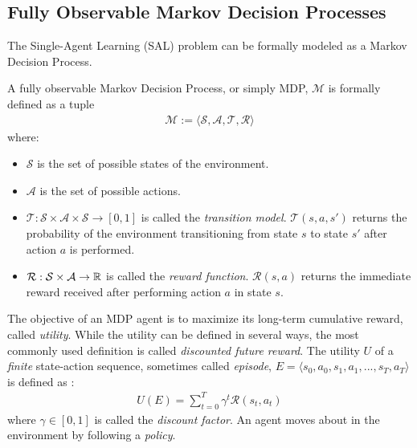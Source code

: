 \subsection{Fully Observable Markov Decision Processes}
\label{sec:mdp}
The Single-Agent Learning (SAL) problem can be formally modeled as a Markov Decision Process.
\begin{definition}
\label{def:fomdp}
A fully observable Markov Decision Process, or simply MDP, $\mathcal{M}$ is formally defined as a tuple \cite{Russell:2009:AIM:1671238}
\begin{align*}
    \mathcal{M} := \big \langle \mathcal{S}, \mathcal{A}, \mathcal{T}, \mathcal{R} \big \rangle
  \end{align*}
where:
\begin{itemize}
    \item $\mathcal{S}$ is the set of possible states of the environment.
    \item $\mathcal{A}$ is the set of possible actions.
    \item $\mathcal{T} : \mathcal{S} \times \mathcal{A} \times \mathcal{S} \rightarrow [0,1]$ is called the \textit{transition model}. $\mathcal{T}(s,a,s')$ returns the probability of the environment transitioning from state $s$ to state $s'$ after action $a$ is performed.
    \item $\mathcal{R}: \mathcal{S} \times \mathcal{A} \rightarrow \mathbb{R}$ is called the \textit{reward function}. $\mathcal{R}(s,a)$ returns the immediate reward received after performing action $a$ in state $s$.
\end{itemize}
\end{definition}
The objective of an MDP agent is to maximize its long-term cumulative reward, called \textit{utility}. While the utility can be defined in several ways, the most commonly used definition is called \textit{discounted future reward}. The utility $U$ of a \textit{finite} state-action sequence, sometimes called \textit{episode}, $E = \big \langle s_0,a_0,s_1, a_1,..., s_T, a_T \big \rangle$ is defined as \cite{Nitti2017}:
\begin{align}
\label{eq:utility}
    U(E) = \sum_{t=0}^{T} \gamma^t \mathcal{R}(s_t, a_t)
\end{align}
where $\gamma \in [0,1]$ is called the \textit{discount factor}. An agent moves about in the environment by following a \textit{policy}.


